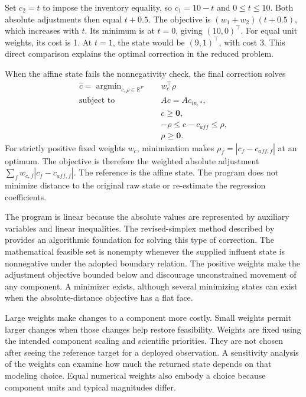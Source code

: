Set \(c_2=t\) to impose the inventory equality, so \(c_1=10-t\) and \(0\leq t\leq10\). Both absolute adjustments then equal \(t+0.5\). The objective is \((w_1+w_2)(t+0.5)\), which increases with \(t\). Its minimum is at \(t=0\), giving \((10,0)^\top\). For equal unit weights, its cost is 1. At \(t=1\), the state would be \((9,1)^\top\), with cost 3. This direct comparison explains the optimal correction in the reduced problem.

When the affine state fails the nonnegativity check, the final correction solves
\begin{equation}
\label{eq:icsor_weighted_correction}
\begin{aligned}
\widehat c =\mathop{\arg\min}_{c,\rho\in\mathbb{R}^{F}}\quad
& w_c^\top\rho\\
\text{subject to}\quad
& Ac=Ac_{in,*},\\
& c\geq\mathbf{0},\\
& -\rho\leq c-c_{aff}\leq\rho,\\
& \rho\geq\mathbf{0}.
\end{aligned}
\end{equation}
For strictly positive fixed weights \(w_c\), minimization makes \(\rho_f=|c_f-c_{aff,f}|\) at an optimum. The objective is therefore the weighted absolute adjustment \(\sum_f w_{c,f}|c_f-c_{aff,f}|\). The reference is the affine state. The program does not minimize distance to the original raw state or re-estimate the regression coefficients.

The program is linear because the absolute values are represented by auxiliary variables and linear inequalities. The revised-simplex method described by \citet{HuangfuHall2018} provides an algorithmic foundation for solving this type of correction. The mathematical feasible set is nonempty whenever the supplied influent state is nonnegative under the adopted boundary relation. The positive weights make the adjustment objective bounded below and discourage unconstrained movement of any component. A minimizer exists, although several minimizing states can exist when the absolute-distance objective has a flat face.

Large weights make changes to a component more costly. Small weights permit larger changes when those changes help restore feasibility. Weights are fixed using the intended component scaling and scientific priorities. They are not chosen after seeing the reference target for a deployed observation. A sensitivity analysis of the weights can examine how much the returned state depends on that modeling choice. Equal numerical weights also embody a choice because component units and typical magnitudes differ.

